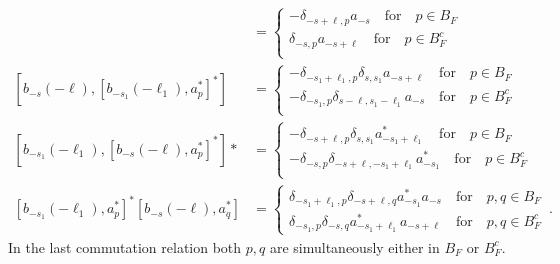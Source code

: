 \documentclass[sn-mathphys, Numbered ,a4paper]{sn-jnl}%
\theoremstyle{plain}
\theoremstyle{definition}
\theoremstyle{remark}
\theoremstyle{plain}
\theoremstyle{definition}
\theoremstyle{remark}
\begin{document}
\begin{align}
	[b_{-s}(-\ell), a^*_{p}] &= 
	\begin{cases}
		-\delta_{-s+\ell,p}a_{-s} \quad\text{for}\quad p \in B_F\\
		\delta_{-s,p}a_{-s+\ell} \quad\text{for}\quad p \in B^c_F\\
	\end{cases}\\
	\left[b_{-s}(-\ell), [b_{-s_1}(-\ell_1),a^*_{p}]^*\right]&=\begin{cases}
		-\delta_{-s_1+\ell_1,p}\delta_{s,s_1}a_{-s+\ell} \quad\text{for}\quad p \in B_F\\
		-\delta_{-s_1,p}\delta_{s-\ell,s_1-\ell_1}a_{-s} \quad\text{for}\quad p \in B^c_F\\
	\end{cases}\\
	\left[b_{-s_1}(-\ell_1),[b_{-s}(-\ell), a^*_{p}]^* \right]* &=\begin{cases}
		-\delta_{-s+\ell,p}\delta_{s,s_1}a^*_{-s_1+\ell_1} \quad\text{for}\quad p \in B_F\\
		-\delta_{-s,p}\delta_{-s+\ell,-s_1+\ell_1}a^*_{-s_1} \quad\text{for}\quad p \in B^c_F\\
	\end{cases}\\
	[b_{-s_1}(-\ell_1),a^*_{p}]^*[b_{-s}(-\ell), a^*_{q}] &= \begin{cases}
		\delta_{-s_1+\ell_1,p}\delta_{-s+\ell,q}a^*_{-s_1}a_{-s} \quad\text{for}\quad p,q \in B_F\\
		\delta_{-s_1,p}\delta_{-s,q}a^*_{-s_1+\ell_1}a_{-s+\ell} \quad\text{for}\quad p,q \in B^c_F 
	\end{cases}\,.
\end{align}
In the last commutation relation both $p,q$ are simultaneously either in $B_F$ or $B_F^c$.
\end{document}
